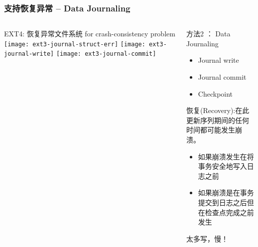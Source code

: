 \begin{frame}[fragile]
	\frametitle{支持恢复异常 -- Data Journaling}
	\begin{columns}
		\begin{column}{.5\textwidth}
			EXT4: 恢复异常文件系统 for crash-consistency problem
			\texttt{[image: ext3-journal-struct-err]}
			\pause
			\texttt{[image: ext3-journal-write]}
			\texttt{[image: ext3-journal-commit]}
		\end{column}
		\begin{column}{.5\textwidth}			
			方法2 ： Data Journaling
			\begin{itemize}
				\item  Journal write
				\item  Journal commit
				\item  Checkpoint
			\end{itemize}
			\pause
			恢复(Recovery):在此更新序列期间的任何时间都可能发生崩溃。
			\begin{itemize}	
				\item 如果崩溃发生在将事务安全地写入日志之前
				\item 如果崩溃是在事务提交到日志之后但在检查点完成之前发生

			\end{itemize}
			\pause
			\Large 太多写，慢！
		\end{column}
	\end{columns}
	
\end{frame}

